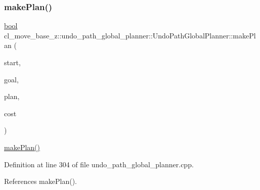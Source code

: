 \mbox{\label{classcl__move__base__z_1_1undo__path__global__planner_1_1UndoPathGlobalPlanner_aca09f640e4bda4d5ccc9613276fd3f71}} 
\subsubsection{\texorpdfstring{make\+Plan()}{makePlan()}\hspace{0.1cm}{\footnotesize\ttfamily [2/2]}}
{\footnotesize\ttfamily \hyperlink{classbool}{bool} cl\+\_\+move\+\_\+base\+\_\+z\+::undo\+\_\+path\+\_\+global\+\_\+planner\+::\+Undo\+Path\+Global\+Planner\+::make\+Plan (\begin{DoxyParamCaption}\item[{const geometry\+\_\+msgs\+::\+Pose\+Stamped \&}]{start,  }\item[{const geometry\+\_\+msgs\+::\+Pose\+Stamped \&}]{goal,  }\item[{std\+::vector$<$ geometry\+\_\+msgs\+::\+Pose\+Stamped $>$ \&}]{plan,  }\item[{double \&}]{cost }\end{DoxyParamCaption})}

\hyperlink{classcl__move__base__z_1_1undo__path__global__planner_1_1UndoPathGlobalPlanner_a46034d27c0811abae440009457a7f8b0}{make\+Plan()} 

Definition at line 304 of file undo\+\_\+path\+\_\+global\+\_\+planner.\+cpp.



References make\+Plan().


